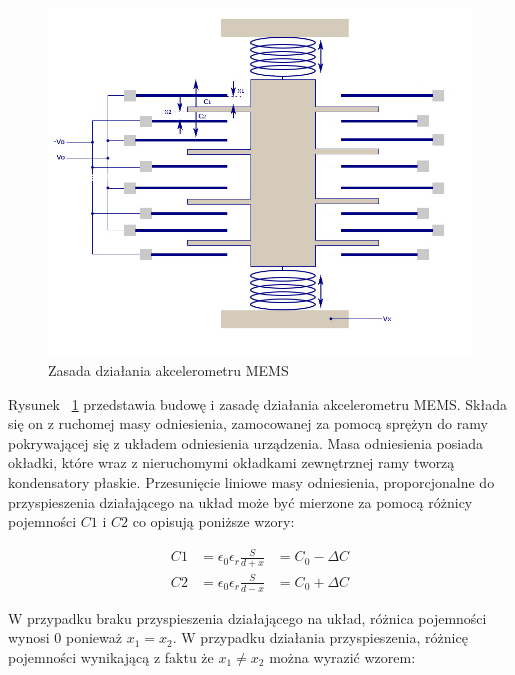 \begin{figure}[H]
	\centering
	\includegraphics[scale=0.4]{Pictures/MEMS-Accelerometer_struct.png}
		\caption[Zasada działania akcelerometru MEMS]{Zasada działania akcelerometru MEMS}
	\label{fig:MEMS-Accelerometer_struct}
\end{figure}

Rysunek ~\ref{fig:MEMS-Accelerometer_struct} przedstawia budowę i zasadę działania akcelerometru MEMS. Składa się on z ruchomej masy odniesienia, zamocowanej za pomocą sprężyn do ramy pokrywającej się z układem odniesienia urządzenia. Masa odniesienia posiada okładki, które wraz z nieruchomymi okładkami zewnętrznej ramy tworzą kondensatory płaskie. Przesunięcie liniowe masy odniesienia, proporcjonalne do przyspieszenia działającego na układ może być mierzone za pomocą różnicy pojemności $C1$ i $C2$ co opisują poniższe wzory:

\begin{equation}
\begin{aligned}
C1 &= \epsilon_0\epsilon_r\frac{S}{d + x} &= C_0 - \Delta{C} \\
C2 &= \epsilon_0\epsilon_r\frac{S}{d - x} &= C_0 + \Delta{C}
\end{aligned}
\label{C_to_delta}
\end{equation} 

W przypadku braku przyspieszenia działającego na układ, różnica pojemności wynosi $0$ ponieważ $x_1 = x_2$. W przypadku działania przyspieszenia, różnicę pojemności wynikającą z faktu że $x_1 \neq x_2$ można wyrazić wzorem:

